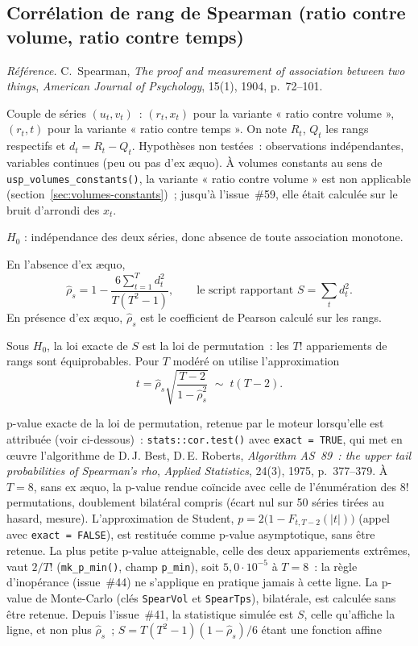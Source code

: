 \documentclass[a4paper,11pt]{article}
\newcommand{\code}[1]{\texttt{\small #1}}
\newcommand{\refl}[1]{{\small\textcolor{maincolor!70!black}{\textit{Référence.} #1}}\par\smallskip}
\newcounter{ficheid}
\newenvironment{fiche}[1]{%
  \stepcounter{ficheid}%
  \phantomsection
  \subsection{#1}%
  \label{fiche:\theficheid}%
}{%
  \end{description}\vspace{0.5em}%
}
\newcommand{\Cadre}{%
  \begin{description}[leftmargin=0pt, style=unboxed, itemsep=3pt, topsep=3pt, parsep=2pt]%
  \item[\textcolor{financeblue}{\textbf{1. Cadre, notations et hypothèses de validité (non testées).}}]}
\newcommand{\Hzero}{\item[\textcolor{financeblue}{\textbf{2. Hypothèse nulle.}}]}
\newcommand{\Stat}{\item[\textcolor{financeblue}{\textbf{3. Statistique de test.}}]}
\newcommand{\Loi}{\item[\textcolor{financeblue}{\textbf{4. Loi sous $H_0$.}}]}
\newcommand{\Pval}{\item[\textcolor{financeblue}{\textbf{5. p-value.}}]}
\begin{document}
\begin{fiche}{Corrélation de rang de Spearman (ratio contre volume, ratio contre temps)}
\label{fiche:spearman}%
\refl{C.~Spearman, \emph{The proof and measurement of association between two things},
\emph{American Journal of Psychology}, 15(1), 1904, p.~72--101.}
\Cadre
Couple de séries $(u_t, v_t)$~: $(r_t, x_t)$ pour la variante « ratio contre volume »,
$(r_t, t)$ pour la variante « ratio contre temps ». On note $R_t$, $Q_t$ les rangs respectifs et
$d_t = R_t - Q_t$. Hypothèses non testées~: observations indépendantes, variables continues (peu
ou pas d'ex \ae quo). À volumes constants au sens de \code{usp\_volumes\_constants()}, la variante
« ratio contre volume » est non applicable (section~\ref{sec:volumes-constants})~; jusqu'à
l'issue~\#59, elle était calculée sur le bruit d'arrondi des $x_t$.
\Hzero
$H_0$ : indépendance des deux séries, donc absence de toute association monotone.
\Stat
En l'absence d'ex \ae quo,
\[
  \hat\rho_s = 1 - \frac{6\sum_{t=1}^{T} d_t^2}{T(T^2-1)} ,
  \qquad\text{le script rapportant } S = \sum_t d_t^2 .
\]
En présence d'ex \ae quo, $\hat\rho_s$ est le coefficient de Pearson calculé sur les rangs.
\Loi
Sous $H_0$, la loi exacte de $S$ est la loi de permutation~: les $T!$ appariements de rangs sont
équiprobables. Pour $T$ modéré on utilise l'approximation
\[
  t = \hat\rho_s\sqrt{\frac{T-2}{1-\hat\rho_s^2}} \;\sim\; t(T-2).
\]
\Pval
p-value exacte de la loi de permutation, retenue par le moteur lorsqu'elle est attribuée (voir
ci-dessous)~: \code{stats::cor.test()} avec
\code{exact = TRUE}, qui met en \oe uvre l'algorithme de D.\,J. Best, D.\,E. Roberts,
\emph{Algorithm AS~89~: the upper tail probabilities of Spearman's rho}, \emph{Applied
Statistics}, 24(3), 1975, p.~377--379. À $T = 8$, sans ex \ae quo, la p-value rendue coïncide
avec celle de l'énumération des $8!$ permutations, doublement bilatéral compris (écart nul sur
50 séries tirées au hasard, mesure).
L'approximation de Student, $p = 2\big(1 - F_{t,T-2}(|t|)\big)$ (appel avec
\code{exact = FALSE}), est restituée comme p-value asymptotique, sans être retenue.
La plus petite p-value atteignable, celle des deux appariements extrêmes, vaut $2/T!$
(\code{mk\_p\_min()}, champ \code{p\_min}), soit $5{,}0\cdot 10^{-5}$ à $T = 8$~: la règle
d'inopérance (issue~\#44) ne s'applique en pratique jamais à cette ligne.
La p-value de Monte-Carlo (clés \code{SpearVol} et \code{SpearTps}), bilatérale, est calculée
sans être retenue. Depuis l'issue~\#41, la statistique simulée est $S$, celle qu'affiche la
ligne, et non plus $\hat\rho_s$~; $S = T(T^2-1)(1-\hat\rho_s)/6$ étant une fonction affine

\end{fiche}
\end{document}
